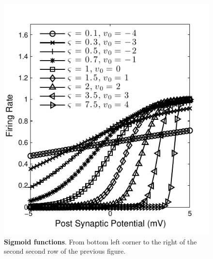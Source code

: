\documentclass[12pt]{iopart}
\begin{document}
\begin{figure}[!ht]
\begin{center}
\includegraphics{./Graph/pdf/sigmoidfunctions.pdf}
\end{center}
\caption{{\bf Sigmoid functions}. From bottom left corner to the right of the second second row of the previous figure.}
\label{fig:sigmoidfunctions}
\end{figure}

\end{document}
